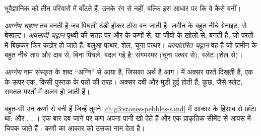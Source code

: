 भूवैज्ञानिक  को तीन परिवारों में बाँटते हैं, उनके रंग से नहीं, बल्कि इस
आधार पर कि वे कैसे बनीं।

\begin{definition}[चट्टानों के तीन परिवार]\label{def:g6:rocks-and-minerals:rock-families}
\emph{आग्नेय चट्टान} तब बनती है जब पिघली  ठंडी होकर
ठोस बन जाती है: ज़मीन के बहुत नीचे ग्रेनाइट,  से बेसाल्ट।
\emph{अवसादी चट्टान} पृथ्वी की सतह पर  और  के
कणों से, या जीवों के खोलों से, बनती है, जो परतों में बिछकर फिर कठोर हो जाते हैं:
बलुआ पत्थर, शेल, चूना पत्थर।
\emph{कायांतरित चट्टान} वह  है जो ज़मीन के बहुत
नीचे ताप और दाब से, बिना पिघले, बदल गई है: संगमरमर
(चूना पत्थर से), स्लेट (शेल से)।
\end{definition}

\emph{आग्नेय} नाम संस्कृत के शब्द ``अग्नि'' से आया है, जिसका अर्थ है आग।  में अक्सर परतें दिखती हैं, एक के ऊपर एक, किसी पुस्तक के पन्नों की तरह।
 अक्सर दबी और मुड़ी हुई होती हैं; कुछ, जैसे स्लेट, समतल
परतों में अलग हो जाती हैं।

बहुत-सी  उन कणों से बनी हैं जिन्हें तुमने
\cref{ch:g3:stones-pebbles-sand} में आकार के हिसाब से छाँटा था:  और , ,
। एक बार दब जाने पर कण अपना पानी खो देते हैं और एक प्राकृतिक सीमेंट से आपस
में चिपक जाते हैं। कणों का आकार  को उसका नाम देता है।

